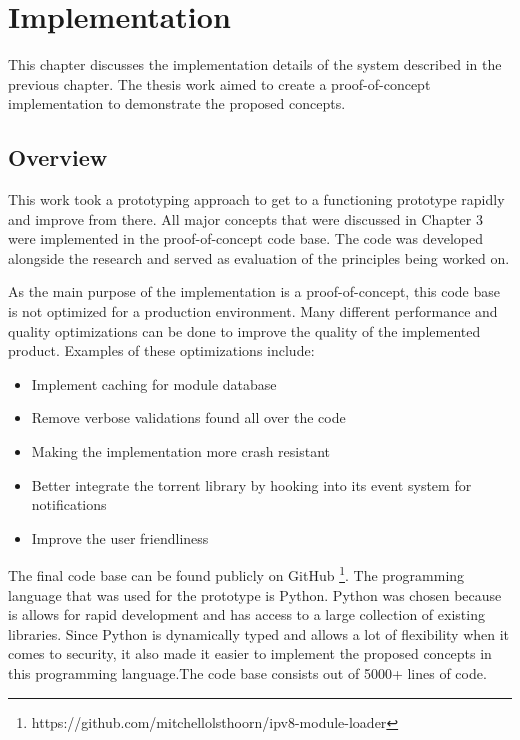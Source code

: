 \chapter{\label{sec:implementation}Implementation}

This chapter discusses the implementation details of the system described in the previous chapter. The thesis work aimed to create a proof-of-concept implementation to demonstrate the proposed concepts. 


\section{Overview}


This work took a prototyping approach to get to a functioning prototype rapidly and improve from there. All major concepts that were discussed in Chapter 3 were implemented in the proof-of-concept code base. The code was developed alongside the research and served as evaluation of the principles being worked on. 

As the main purpose of the implementation is a proof-of-concept, this code base is not optimized for a production environment. Many different performance and quality optimizations can be done to improve the quality of the implemented product. Examples of these optimizations include:

\begin{itemize}
	\item Implement caching for module database
	\item Remove verbose validations found all over the code
	\item Making the implementation more crash resistant
	\item Better integrate the torrent library by hooking into its event system for notifications 
	\item Improve the user friendliness
\end{itemize}

The final code base can be found publicly on GitHub \footnote{https://github.com/mitchellolsthoorn/ipv8-module-loader}. The programming language that was used for the prototype is Python. Python was chosen because is allows for rapid development and has access to a large collection of existing libraries. Since Python is dynamically typed and allows a lot of flexibility when it comes to security, it also made it easier to implement the proposed concepts in this programming language.The code base consists out of 5000+ lines of code.

